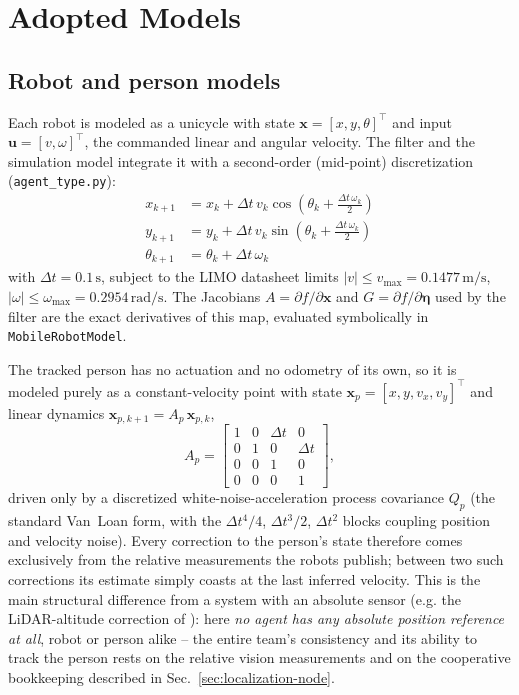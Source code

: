 \documentclass[10pt,conference]{IEEEtran}
\begin{document}
\section{Adopted Models}

\subsection{Robot and person models}

Each robot is modeled as a unicycle with state $\mathbf{x} = [x, y, \theta]^\top$ and input
$\mathbf{u} = [v, \omega]^\top$, the commanded linear and angular velocity. The filter and the
simulation model integrate it with a second-order (mid-point) discretization
(\texttt{agent\_type.py}):
\begin{align}
x_{k+1} &= x_k + \Delta t\, v_k \cos\!\left(\theta_k + \tfrac{\Delta t\, \omega_k}{2}\right) \\
y_{k+1} &= y_k + \Delta t\, v_k \sin\!\left(\theta_k + \tfrac{\Delta t\, \omega_k}{2}\right) \\
\theta_{k+1} &= \theta_k + \Delta t\, \omega_k
\end{align}
with $\Delta t = 0.1\,\mathrm{s}$, subject to the LIMO datasheet limits
$|v|\le v_{\max}=0.1477\,\mathrm{m/s}$, $|\omega|\le\omega_{\max}=0.2954\,\mathrm{rad/s}$. The
Jacobians $A=\partial f/\partial\mathbf{x}$ and $G=\partial f/\partial\boldsymbol{\eta}$ used by
the filter are the exact derivatives of this map, evaluated symbolically in
\texttt{MobileRobotModel}.

The tracked person has no actuation and no odometry of its own, so it is modeled purely as a
constant-velocity point with state $\mathbf{x}_p = [x, y, v_x, v_y]^\top$ and linear dynamics
$\mathbf{x}_{p,k+1} = A_p\,\mathbf{x}_{p,k}$,
\begin{equation}
A_p = \begin{bmatrix} 1 & 0 & \Delta t & 0 \\ 0 & 1 & 0 & \Delta t \\ 0 & 0 & 1 & 0 \\ 0 & 0 & 0 & 1 \end{bmatrix},
\end{equation}
driven only by a discretized white-noise-acceleration process covariance $Q_p$ (the standard
Van~Loan form, with the $\Delta t^4/4$, $\Delta t^3/2$, $\Delta t^2$ blocks coupling position and
velocity noise). Every correction to the person's state therefore comes exclusively from the
relative measurements the robots publish; between two such corrections its estimate simply
coasts at the last inferred velocity. This is the main structural difference from a system with
an absolute sensor (e.g. the LiDAR-altitude correction of \cite{renelli-zanolini-artva}): here
\emph{no agent has any absolute position reference at all}, robot or person alike -- the entire
team's consistency and its ability to track the person rests on the relative vision measurements
and on the cooperative bookkeeping described in Sec.~\ref{sec:localization-node}.
\end{document}
